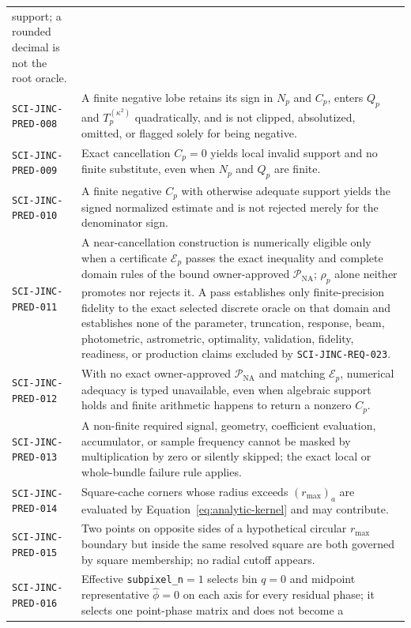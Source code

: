\begin{longtable}{@{}>{\raggedright\arraybackslash}p{}
                        >{\raggedright\arraybackslash}p{}@{}}
support; a rounded decimal is not the root oracle. \\
\texttt{SCI-JINC-PRED-008} & A finite negative lobe retains its sign in $N_p$
and $C_p$, enters $Q_p$ and $T_p^{(\kappa^2)}$ quadratically, and is not
clipped, absolutized, omitted, or flagged solely for being negative. \\
\texttt{SCI-JINC-PRED-009} & Exact cancellation $C_p=0$ yields local invalid
support and no finite substitute, even when $N_p$ and $Q_p$ are finite. \\
\texttt{SCI-JINC-PRED-010} & A finite negative $C_p$ with otherwise adequate
support yields the signed normalized estimate and is not rejected merely for
the denominator sign. \\
\texttt{SCI-JINC-PRED-011} & A near-cancellation construction is numerically
eligible only when a certificate $\mathcal{E}_p$ passes the exact inequality
and complete domain rules of the bound owner-approved
$\mathcal{P}_{\mathrm{NA}}$; $\rho_p$ alone neither promotes nor rejects it.
A pass establishes only finite-precision fidelity to the exact selected
discrete oracle on that domain and establishes none of the parameter,
truncation, response, beam, photometric, astrometric, optimality, validation,
fidelity, readiness, or production claims excluded by
\texttt{SCI-JINC-REQ-023}. \\
\texttt{SCI-JINC-PRED-012} & With no exact owner-approved
$\mathcal{P}_{\mathrm{NA}}$ and matching $\mathcal{E}_p$, numerical adequacy is
typed unavailable, even when algebraic support holds and finite arithmetic
happens to return a nonzero $C_p$. \\
\texttt{SCI-JINC-PRED-013} & A non-finite required signal, geometry,
coefficient evaluation, accumulator, or sample frequency cannot be masked by
multiplication by zero or silently skipped; the exact local or whole-bundle
failure rule applies. \\
\texttt{SCI-JINC-PRED-014} & Square-cache corners whose radius exceeds
$(r_{\max})_a$ are evaluated by Equation~\eqref{eq:analytic-kernel} and may
contribute. \\
\texttt{SCI-JINC-PRED-015} & Two points on opposite sides of a hypothetical
circular $r_{\max}$ boundary but inside the same resolved square are both
governed by square membership; no radial cutoff appears. \\
\texttt{SCI-JINC-PRED-016} & Effective \texttt{subpixel\_n}$=1$ selects bin
$q=0$ and midpoint representative $\widehat\phi=0$ on each axis for every
residual phase; it selects one point-phase matrix and does not become a

\end{longtable}
